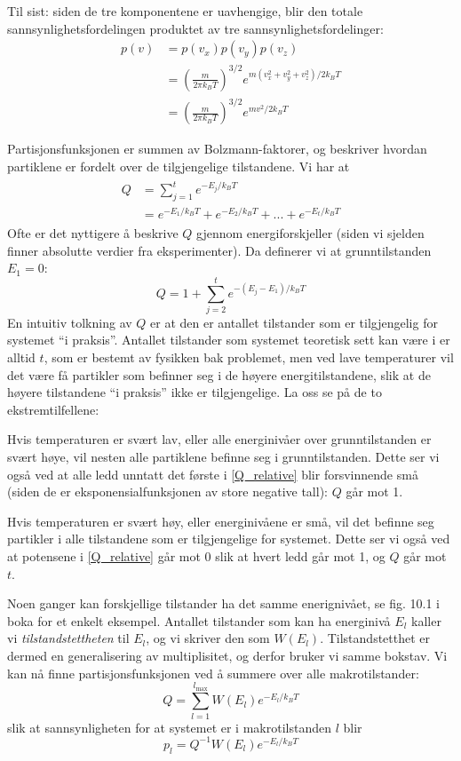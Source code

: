 Til sist: siden de tre komponentene er uavhengige, blir den totale sannsynlighetsfordelingen produktet av tre sannsynlighetsfordelinger:
\begin{align}
    p(v)&=p(v_x)p(v_y)p(v_z)\\
    &=\left(\frac{m}{2\pi k_BT}\right)^{3/2}e^{m(v_x^2+v_y^2+v_z^2)/2k_BT} \\
    &=\left(\frac{m}{2\pi k_BT}\right)^{3/2}e^{mv^2/2k_BT}
\end{align}

Partisjonsfunksjonen er summen av Bolzmann-faktorer, og beskriver hvordan partiklene er fordelt over de tilgjengelige tilstandene. Vi har at
\begin{align}\begin{split}
	\label{Q_absolute}
	Q&=\sum_{j=1}^{t}e^{-E_j/k_BT}\\&=e^{-E_1/k_BT}+e^{-E_2/k_BT}+...+e^{-E_t/k_BT}
\end{split}\end{align}
Ofte er det nyttigere å beskrive $Q$ gjennom energiforskjeller (siden vi sjelden finner absolutte verdier fra eksperimenter). Da definerer vi at grunntilstanden $E_1=0$:
\begin{equation}
	\label{Q_relative}
	Q=1+\sum_{j=2}^t e^{-(E_j-E_1)/k_BT}
\end{equation}
En intuitiv tolkning av $Q$ er at den er antallet tilstander som er tilgjengelig for systemet ``i praksis''. Antallet tilstander som systemet teoretisk sett kan være i er alltid $t$, som er bestemt av fysikken bak problemet, men ved lave temperaturer vil det være få partikler som befinner seg i de høyere energitilstandene, slik at de høyere tilstandene ``i praksis'' ikke er tilgjengelige. La oss se på de to ekstremtilfellene: 

Hvis temperaturen er svært lav, eller alle energinivåer over grunntilstanden er svært høye, vil nesten alle partiklene befinne seg i grunntilstanden. Dette ser vi også ved at alle ledd unntatt det første i \eqref{Q_relative} blir forsvinnende små (siden de er eksponensialfunksjonen av store negative tall): $Q$ går mot 1.

Hvis temperaturen er svært høy, eller energinivåene er små, vil det befinne seg partikler i alle tilstandene som er tilgjengelige for systemet. Dette ser vi også ved at potensene i \eqref{Q_relative} går mot 0 slik at hvert ledd går mot 1, og $Q$ går mot $t$.

Noen ganger kan forskjellige tilstander ha det samme enerignivået, se fig. 10.1 i boka for et enkelt eksempel. Antallet tilstander som kan ha energinivå $E_l$ kaller vi \emph{tilstandstettheten} til $E_l$, og vi skriver den som $W(E_l)$. Tilstandstetthet er dermed en generalisering av multiplisitet, og derfor bruker vi samme bokstav. Vi kan nå finne partisjonsfunksjonen ved å summere over alle makrotilstander:
\begin{equation}
	Q=\sum_{l=1}^{l_{\text{max}}} W(E_l)e^{-E_l/k_BT}
\end{equation}
slik at sannsynligheten for at systemet er i makrotilstanden $l$ blir 
\begin{equation}
	p_l=Q^{-1}W(E_l)e^{-E_l/k_BT}
\end{equation}

